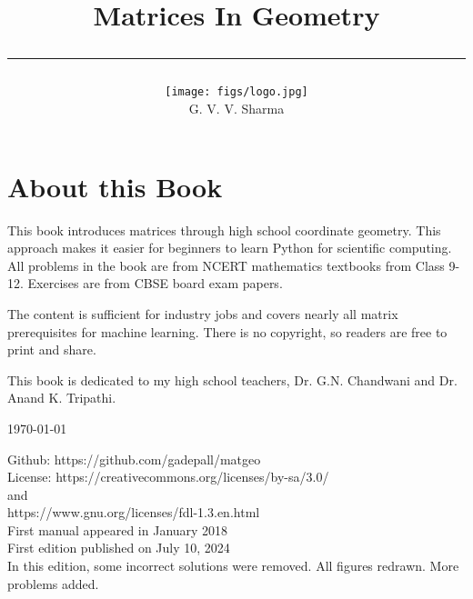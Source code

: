 \documentclass[journal]{IEEEtran}
\begin{document}

\onecolumn


\title{
	\begin{center}
	Matrices In Geometry
	\\
\rule{0.4\columnwidth}{0.4pt}
\end{center}
}
\author{
\vspace{11cm}
	\begin{center}
\texttt{[image: figs/logo.jpg]}
\\
		{	\huge G. V. V. Sharma}
	\end{center}
}
\maketitle

\newpage
\section*{About this Book}

This book introduces matrices through high school coordinate geometry. This approach makes it easier for beginners to learn Python for scientific computing. All problems in the book are from NCERT mathematics textbooks from Class 9-12.  Exercises are from CBSE board exam papers.   

The content is sufficient for industry jobs and covers nearly all matrix prerequisites for machine learning.
There is no copyright, so readers are free to print and share.  

This book is dedicated to my high school teachers, Dr. G.N. Chandwani and Dr. Anand K. Tripathi.
\begin{flushright}
\today
\end{flushright}
Github: https://github.com/gadepall/matgeo
		\\
License: https://creativecommons.org/licenses/by-sa/3.0/
\\
and
\\
https://www.gnu.org/licenses/fdl-1.3.en.html
\\
First manual appeared in January 2018
\\
First edition published on July 10, 2024
\\
In this edition, some incorrect solutions were removed.  All figures redrawn. More problems added.
\end{document}
